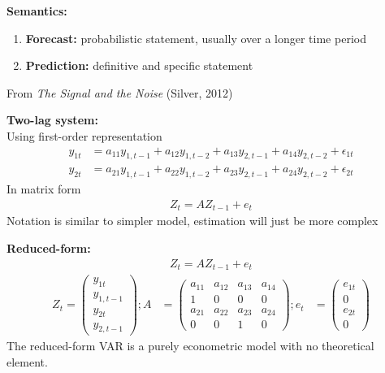 \documentclass{beamer}
\begin{document}
\begin{frame}
  \textbf{Semantics:}
  \medskip
  \begin{enumerate}
    \item \textbf{Forecast:} probabilistic statement, usually over a longer time period\\    
    \item \textbf{Prediction:} definitive and specific statement 
  \end{enumerate}
  \medskip
  From \textit{The Signal and the Noise} (Silver, 2012)
\end{frame}


\begin{frame}
  \textbf{Two-lag system:}\\ Using first-order representation
  \begin{align}
    y_{1t} &= a_{11} y_{1, t-1} + a_{12} y_{1,t-2} + a_{13} y_{2, t-1} + a_{14} y_{2,t-2} + \epsilon_{1t}\\ \nonumber
    y_{2t} &= a_{21} y_{1, t-1} + a_{22} y_{1,t-2} + a_{23} y_{2, t-1} + a_{24} y_{2,t-2} + \epsilon_{2t}
  \end{align}
  \medskip
  In matrix form
  \begin{align}  
    Z_t = AZ_{t-1} + e_t 
  \end{align}
  \medskip
  Notation is similar to simpler model, estimation will just be more complex  
\end{frame}

\begin{frame}
  \textbf{Reduced-form:}
  \begin{align*}
    Z_t = AZ_{t-1} + e_t 
  \end{align*}
  \begin{align}
      Z_t= \begin{pmatrix}
      y_{1t} \\ y_{1,t-1} \\ y_{2t} \\ y_{2,t-1}    
      \end{pmatrix};
      A & = \begin{pmatrix}
        a_{11} & a_{12} & a_{13} & a_{14}\\
        1      & 0      & 0      & 0\\
        a_{21} & a_{22} & a_{23} & a_{24}\\
        0      & 0      & 1      & 0    
      \end{pmatrix};
      e_t &= \begin{pmatrix}
        e_{1t} \\ 0 \\ e_{2t} \\ 0 
      \end{pmatrix}
    \end{align}
    \medskip
    The reduced-form VAR is a purely econometric model with no theoretical element.     
\end{frame}
\end{document}
